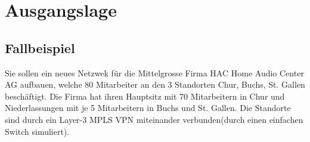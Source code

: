 \documentclass[12pt,a4paper,titlepage]{article}
\begin{document}
\pagebreak

\tableofcontents 
\pagebreak

\listoffigures


\listoftables 
\newpage

\section{Ausgangslage} 
\subsection{Fallbeispiel}
Sie sollen ein neues Netzwek für die Mittelgrosse Firma HAC Home Audio Center AG aufbauen, welche 80 Mitarbeiter an den 3 Standorten Chur, Buchs, St. Gallen beschäftigt. Die Firma hat ihren Hauptsitz mit 70 Mitarbeitern in Chur und Niederlassungen mit je 5 Mitarbeitern in Buchs und St. Gallen. Die Standorte sind durch ein Layer-3 MPLS VPN miteinander verbunden(durch einen einfachen Switch simuliert).
\newpage
\end{document}
